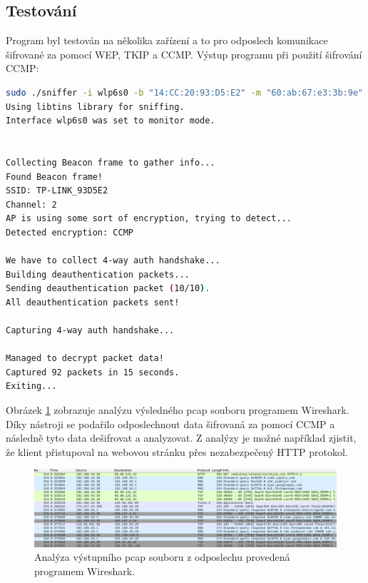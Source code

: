 \subsection{Testování}
Program byl testován na několika zařízení a to pro odposlech komunikace šifrované za pomocí WEP, TKIP a CCMP. Výstup programu při použití šifrování CCMP:
\begin{lstlisting}[language=bash]
sudo ./sniffer -i wlp6s0 -b "14:CC:20:93:D5:E2" -m "60:ab:67:e3:3b:9e" -k tajneheslo
Using libtins library for sniffing.
Interface wlp6s0 was set to monitor mode.
 
 
Collecting Beacon frame to gather info...
Found Beacon frame!
SSID: TP-LINK_93D5E2
Channel: 2
AP is using some sort of encryption, trying to detect...
Detected encryption: CCMP
 
We have to collect 4-way auth handshake...
Building deauthentication packets...
Sending deauthentication packet (10/10).
All deauthentication packets sent!
 
Capturing 4-way auth handshake...
 
Managed to decrypt packet data!
Captured 92 packets in 15 seconds.
Exiting...
\end{lstlisting}

Obrázek \ref{img:sniffer-wireshark} zobrazuje analýzu výsledného pcap souboru programem Wireshark. Díky nástroji se podařilo odposlechnout data šifrovaná za pomocí CCMP a následně tyto data dešifrovat a analyzovat. Z analýzy je možné například zjistit, že klient přistupoval na webovou stránku přes nezabezpečený HTTP protokol.
\begin{figure}[htbp]
  \centering
  \includegraphics[width=14.9cm]{obrazky-figures/sniffer-wireshark.png}
  \caption{Analýza výstupního pcap souboru z odposlechu provedená programem Wireshark.}
  \label{img:sniffer-wireshark}
\end{figure}

